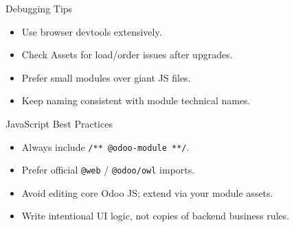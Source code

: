 \begin{frame}[fragile]{Debugging Tips}
	\begin{itemize}
		\item Use browser devtools extensively.
		\item Check Assets for load/order issues after upgrades.
		\item Prefer small modules over giant JS files.
		\item Keep naming consistent with module technical names.
	\end{itemize}
\end{frame}

\begin{frame}{JavaScript Best Practices}
	\begin{itemize}
		\item Always include \texttt{/** @odoo-module **/}.
		\item Prefer official \texttt{@web} / \texttt{@odoo/owl} imports.
		\item Avoid editing core Odoo JS; extend via your module assets.
		\item Write intentional UI logic, not copies of backend business rules.
	\end{itemize}
\end{frame}
